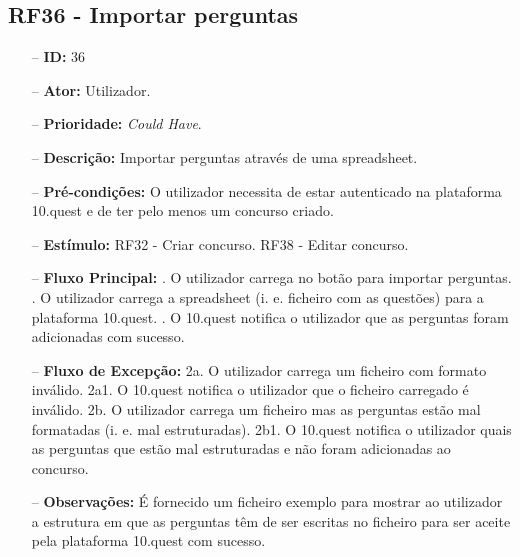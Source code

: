 \subsection{RF36 - Importar perguntas}
\begin{itemize}
	\item[--] \textbf{ID:} 36
	\item[--]  \textbf{Ator:} Utilizador.
	\item[--]  \textbf{Prioridade:} \textit{Could Have}.
	\item[--]  \textbf{Descrição:} Importar perguntas através de uma spreadsheet. 
	\item[--]  \textbf{Pré-condições:} O utilizador necessita de estar autenticado na plataforma 10.quest e de ter pelo menos um concurso criado.
	\item[--]  \textbf{Estímulo:}  
	\subitem RF32 - Criar concurso.
	\subitem RF38 - Editar concurso.
	\item[--]  \textbf{Fluxo Principal:} 
	. O utilizador carrega no botão para importar perguntas.
	. O utilizador carrega a spreadsheet (i. e. ficheiro com as questões) para a plataforma 10.quest.
	. O 10.quest notifica o utilizador que as perguntas foram adicionadas com sucesso.
	\item[--]  \textbf{Fluxo de Excepção:} 
	\subitem 2a. O utilizador carrega um ficheiro com formato inválido.
	\subitem 2a1. O 10.quest notifica o utilizador que o ficheiro carregado é inválido.
	\subitem 2b. O utilizador carrega um ficheiro mas as perguntas estão mal formatadas (i. e. mal estruturadas).
	\subitem 2b1. O 10.quest notifica o utilizador quais as perguntas que estão mal estruturadas e não foram adicionadas ao concurso.
	\item[--]  \textbf{Observações:} É fornecido um ficheiro exemplo para mostrar ao utilizador a estrutura em que as perguntas têm de ser escritas no ficheiro para ser aceite pela plataforma 10.quest com sucesso.
\end{itemize}
\newpage

